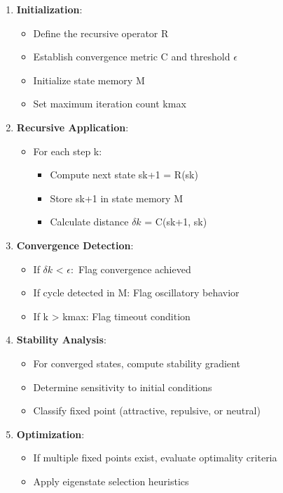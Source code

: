 \documentclass[
]{article}
\providecommand{\tightlist}{%
  \setlength{\itemsep}{0pt}\setlength{\parskip}{0pt}}
\begin{document}
\begin{enumerate}
\def\labelenumi{\arabic{enumi}.}
\tightlist
\item
  \textbf{Initialization}:

  \begin{itemize}
  \tightlist
  \item
    Define the recursive operator R
  \item
    Establish convergence metric C and threshold \(\epsilon \)
  \item
    Initialize state memory M
  \item
    Set maximum iteration count kmax
  \end{itemize}
\item
  \textbf{Recursive Application}:

  \begin{itemize}
  \tightlist
  \item
    For each step k:

    \begin{itemize}
    \tightlist
    \item
      Compute next state sk+1 = R(sk)
    \item
      Store sk+1 in state memory M
    \item
      Calculate distance \(\delta k\) = C(sk+1, sk)
    \end{itemize}
  \end{itemize}
\item
  \textbf{Convergence Detection}:

  \begin{itemize}
  \tightlist
  \item
    If \(\delta k\) \textless{} \(\epsilon :\) Flag convergence achieved
  \item
    If cycle detected in M: Flag oscillatory behavior
  \item
    If k \textgreater{} kmax: Flag timeout condition
  \end{itemize}
\item
  \textbf{Stability Analysis}:

  \begin{itemize}
  \tightlist
  \item
    For converged states, compute stability gradient
  \item
    Determine sensitivity to initial conditions
  \item
    Classify fixed point (attractive, repulsive, or neutral)
  \end{itemize}
\item
  \textbf{Optimization}:

  \begin{itemize}
  \tightlist
  \item
    If multiple fixed points exist, evaluate optimality criteria
  \item
    Apply eigenstate selection heuristics
  \end{itemize}
\end{enumerate}
\end{document}
